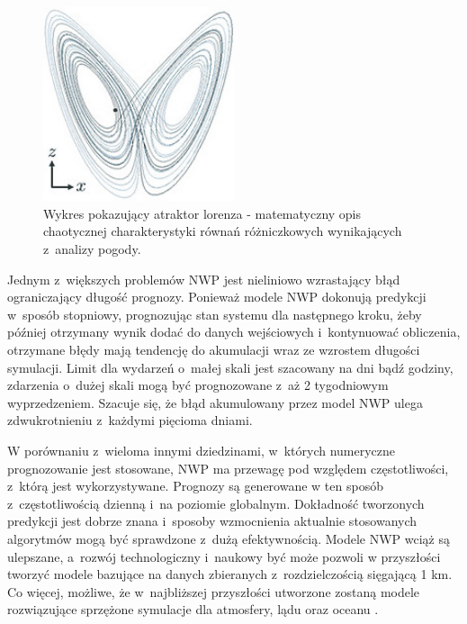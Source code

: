 \begin{figure}[H]
    \centering
    \includegraphics[width=0.5\textwidth]{images/lorenz.jpeg}
    \caption[Atraktor Lorenza]{Wykres pokazujący atraktor lorenza - matematyczny opis chaotycznej 
    charakterystyki równań różniczkowych wynikających z~analizy pogody.\footnotemark}
    \label{lorenz}
\end{figure}

Jednym z~większych problemów NWP jest nieliniowo wzrastający błąd ograniczający długość prognozy.
Ponieważ modele NWP dokonują predykcji w~sposób stopniowy, prognozując stan systemu dla następnego
kroku, żeby później otrzymany wynik dodać do danych wejściowych i~kontynuować obliczenia, otrzymane błędy
mają tendencję do akumulacji wraz ze wzrostem długości symulacji.
Limit dla wydarzeń o~małej skali jest szacowany na dni bądź godziny, zdarzenia o~dużej skali
mogą być prognozowane z~aż 2 tygodniowym wyprzedzeniem. Szacuje się, że błąd akumulowany przez 
model NWP ulega zdwukrotnieniu z~każdymi pięcioma dniami.

W porównaniu z~wieloma innymi dziedzinami, w~których numeryczne prognozowanie jest stosowane,
NWP ma przewagę pod względem częstotliwości, z~którą jest wykorzystywane. Prognozy są generowane
w ten sposób z~częstotliwością dzienną i~na poziomie globalnym. Dokładność tworzonych predykcji jest
dobrze znana i~sposoby wzmocnienia aktualnie stosowanych algorytmów mogą być sprawdzone z~dużą
efektywnością. Modele NWP wciąż są ulepszane, a~rozwój technologiczny i~naukowy być może pozwoli
w przyszłości tworzyć modele bazujące na danych zbieranych z~rozdzielczością sięgającą 1 km. Co więcej,
możliwe, że w~najbliższej przyszłości utworzone zostaną modele rozwiązujące sprzężone symulacje
dla atmosfery, lądu oraz oceanu \cite{nwp-the-quiet-revolution}.

